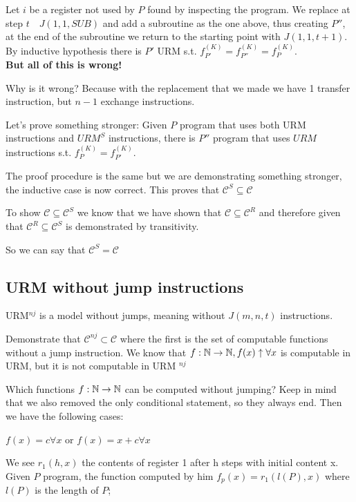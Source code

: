 Let $i$ be a register not used by $P$ found by inspecting the program. We replace at step $t \quad J (1,1, SUB)$ and add a subroutine as the one above, thus creating $ P'' $, at the end of the subroutine we return to the starting point with $J (1,1, t + 1)$. By inductive hypothesis there is $ P' $ URM s.t. $ f_{P'}^{(K)} = f_{P''}^{(K)} = f_{P}^{(K)}$. \\
\textbf{But all of this is wrong!}

Why is it wrong? Because with the replacement that we made we have 1 transfer instruction, but $n-1$ exchange instructions.

Let's prove something stronger: Given $P$ program that uses both URM instructions and  $URM^S $ instructions, there is $ P'' $ program that uses $URM$ instructions s.t. $ f_{P}^{(K)} = f_{P'}^{(K)} $.

The proof procedure is the same but we are demonstrating something stronger, the inductive case is now correct. This proves that $ \mathcal{C}^S \subseteq \mathcal{C} $

To show $  \mathcal{C} \subseteq \mathcal{C}^S $ we know that we have shown that $ \mathcal{C} \subseteq \mathcal{C}^R $ and therefore given that $ \mathcal{C}^R \subseteq \mathcal{C}^S $ is demonstrated by transitivity.

So we can say that $ \mathcal{C}^S = \mathcal{C} $

\subsection{URM without jump instructions}

URM$ ^{nj} $ is a model without jumps, meaning without $J(m,n,t)$ instructions.

Demonstrate that $ \mathcal{C}^{nj} \subset \mathcal{C} $ where the first is the set of computable functions without a jump instruction. We know that $ f: \mathbb{N} \rightarrow \mathbb{N}, f(x)\uparrow \forall x $ is computable in URM, but it is not computable in URM $ ^{nj} $

Which functions $ f: \mathbb{N} \rightarrow \mathbb{N} $ can be computed without jumping? Keep in mind that we also removed the only conditional statement, so they always end. Then we have the following cases:

$f(x) = c  \forall x $ or $ f(x) = x + c \forall x $

We see $ r_1(h,x) $ the contents of register 1 after h steps with initial content x. Given $P$ program, the function computed by him $ f_p(x) = r_1(l(P), x) $ where $ l(P) $ is the length of $P$;

